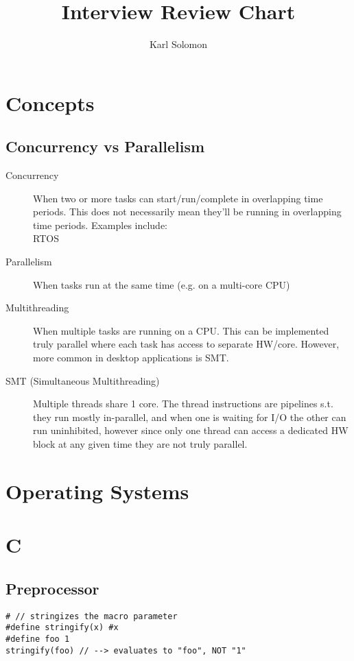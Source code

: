 \documentclass{article}
\begin{document}
\selectfont
\title{Interview Review Chart}
\author{Karl Solomon}
\maketitle
\section{Concepts}
\subsection{Concurrency vs Parallelism}
\begin{description}
	\item[Concurrency]
	      When two or more tasks can start/run/complete in overlapping time periods. This does not necessarily mean they'll be running in overlapping time periods. Examples include: \\ RTOS
\end{description}
\begin{description}
	\item[Parallelism]
	      When tasks run at the same time (e.g. on a multi-core CPU)
\end{description}
\begin{description}
	\item[Multithreading]
	      When multiple tasks are running on a CPU. This can be implemented truly parallel where each task has access to separate HW/core. However, more common in desktop applications is SMT.
\end{description}
\begin{description}
	\item[SMT (Simultaneous Multithreading)]
	      Multiple threads share 1 core. The thread instructions are pipelines s.t. they run mostly in-parallel, and when one is waiting for I/O the other can run uninhibited, however since only one thread can access a dedicated HW block at any given time they are not truly parallel.
\end{description}
\section{Operating Systems}
\section{C}
\subsection{Preprocessor}
\begin{lstlisting}[style=cpp]
# // stringizes the macro parameter
#define stringify(x) #x
#define foo 1
stringify(foo) // --> evaluates to "foo", NOT "1"
\end{lstlisting}
\end{document}
